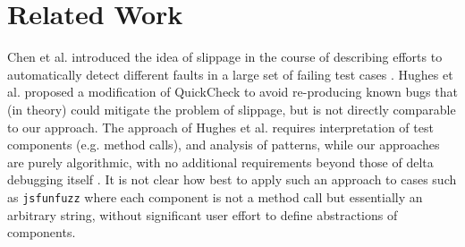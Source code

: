 \section{Related Work}

Chen et al. introduced the idea of slippage in the course of
describing efforts to automatically detect different faults in a large
set of failing test cases \cite{PLDI13}.  Hughes et
al. \cite{FindMoreBugs} proposed a modification of QuickCheck
\cite{ClaessenH00} to avoid re-producing known bugs that (in theory)
could mitigate the problem of slippage, but is not directly comparable
to our approach.  The approach of Hughes et al. requires
interpretation of test components (e.g. method calls), and analysis of
patterns, while our approaches are purely algorithmic, with no
additional requirements beyond those of delta debugging itself
\cite{DD}.  It is not clear how best to apply such an approach
 to cases such as {\tt jsfunfuzz} where each component is not a
method call but essentially an arbitrary string, without significant
user effort to define abstractions of components.